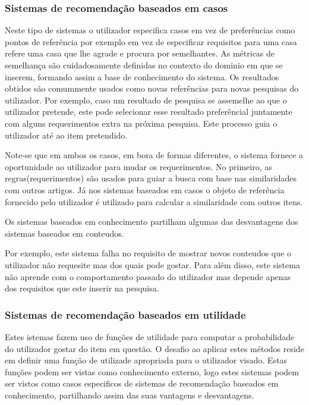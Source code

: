 \subsubsection{Sistemas de recomendação baseados em casos}
\hfill
\par Neste tipo de sistemas o utilizador especifica casos  em vez de preferências como pontos de referência por exemplo em vez de especificar requisitos para uma casa refere uma casa que lhe agrade e procura por semelhantes. As métricas de semelhança são cuidadosamente definidas no contexto do dominio em que se inserem, formando assim a base de conhecimento do sistema. Os resultados obtidos são comummente usados como novas referências para novas pesquisas do utilizador.  Por exemplo, caso um resultado de pesquisa se assemelhe ao que o utilizador pretende, este pode selecionar esse resultado preferêncial juntamente com alguns requerimentos extra na próxima pesquisa. Este processo guia o utilizador até ao item pretendido.
\par Note-se que em ambos os casos, em bora de formas diferentes, o sistema fornece a oportunidade ao utilizador para mudar os requerimentos.
No primeiro, as regras(requerimentos) são usados para guiar a busca com base nas similaridades com outros artigos. Já nos sistemas baseados em casos o objeto de referência fornecido pelo utilizador é utilizado para calcular a similaridade com outros itens.
\par Os sistemas baseados em conhecimento partilham algumas das desvantagens dos sistemas baseados em conteudos. 
\par Por exemplo, este sistema falha no requisito de mostrar novos conteudos que o utilizador não requesite mas dos quais pode gostar.
Para além disso, este sistema não aprende com o comportamento passado do utilizador mas depende apenas dos requisitos que este inserir na pesquisa.

\hfill
\subsubsection{Sistemas de recomendação baseados em utilidade}
\hfill
\par Estes istemas fazem uso de funções de utilidade para computar a probabilidade do utilizador gostar do item em questão. O desafio ao aplicar estes métodos reside em definir uma função de utilizade apropriada para o utilizador visado. Estas funções podem ser vistas como conhecimento externo, logo estes sistemas podem ser vistos como casos especificos de sistemas de recomendação baseados em conhecimento, partilhando assim das suas vantagens e desvantagens.

